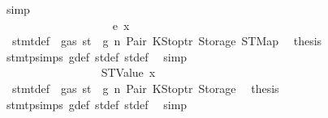 \begin{isabellebody}
\ simp\isanewline
\ \ \ \ \ \ \ \ \ \ \ \ \ \ \ \ \ \ \ \ \isamarkupfalse%
\isanewline
\ \ \ \ \ \ \ \ \ \ \ \ \ \ \ \ \ \ \isamarkupfalse%
\isanewline
\ \ \ \ \ \ \ \ \ \ \ \ \ \ \ \ \isamarkupfalse%
\isanewline
\ \ \ \ \ \ \ \ \ \ \ \ \ \ \ \ \ \ \isamarkupfalse%
\ {\isacharparenleft}{\kern0pt}e\ x{\isacharparenright}{\kern0pt}\isanewline
\ \ \ \ \ \ \ \ \ \ \ \ \ \ \ \ \ \ \isamarkupfalse%
\ {}{\isacharparenleft}{\kern0pt}{}{\isacharparenright}{\kern0pt}\ stmt{\isacharunderscore}{\kern0pt}def\ {\isacharbackquoteopen}{\isasymnot}\ gas\ st\ {\isasymle}\ g{\isacharbackquoteclose}\ n\ Pair\ KStoptr\ Storage\ STMap\ \isamarkupfalse%
\ {\isacharquery}{\kern0pt}thesis\ \isamarkupfalse%
\ stmt{\isachardot}{\kern0pt}psimps{\isacharparenleft}{\kern0pt}{}{\isacharparenright}{\kern0pt}\ g{\isacharunderscore}{\kern0pt}def\ st{\isacharprime}{\kern0pt}{\isacharunderscore}{\kern0pt}def\ st{\isacharprime}{\kern0pt}{\isacharprime}{\kern0pt}{\isacharunderscore}{\kern0pt}def\ \isamarkupfalse%
\ simp\isanewline
\ \ \ \ \ \ \ \ \ \ \ \ \ \ \ \ \isamarkupfalse%
\isanewline
\ \ \ \ \ \ \ \ \ \ \ \ \ \ \isamarkupfalse%
\isanewline
\ \ \ \ \ \ \ \ \ \ \ \ \ \ \ \ \isamarkupfalse%
\ {\isacharparenleft}{\kern0pt}STValue\ x{}{\isacharparenright}{\kern0pt}\isanewline
\ \ \ \ \ \ \ \ \ \ \ \ \ \ \ \ \isamarkupfalse%
\ {}{\isacharparenleft}{\kern0pt}{}{\isacharparenright}{\kern0pt}\ stmt{\isacharunderscore}{\kern0pt}def\ {\isacharbackquoteopen}{\isasymnot}\ gas\ st\ {\isasymle}\ g{\isacharbackquoteclose}\ n\ Pair\ KStoptr\ Storage\ \isamarkupfalse%
\ {\isacharquery}{\kern0pt}thesis\ \isamarkupfalse%
\ stmt{\isachardot}{\kern0pt}psimps{\isacharparenleft}{\kern0pt}{}{\isacharparenright}{\kern0pt}\ g{\isacharunderscore}{\kern0pt}def\ st{\isacharprime}{\kern0pt}{\isacharunderscore}{\kern0pt}def\ st{\isacharprime}{\kern0pt}{\isacharprime}{\kern0pt}{\isacharunderscore}{\kern0pt}def\ \isamarkupfalse%
\ simp\isanewline
\ \ \ \ \ \ \ \ \ \ \ \ \ \ \isamarkupfalse%
\isanewline
\ \ \ \ \ \ \ \ \ \ \ \ \isamarkupfalse%
\isanewline
\ \ \ \ \ \ \ \ \ \ \isamarkupfalse%
\isanewline
\ \ \ \ \ \ \ \ \isamarkupfalse%
\isanewline
\ \ \ \ \ \ \isamarkupfalse%
\isanewline
\ \ \ \ \ \ \ \ \isamarkupfalse%

\end{isabellebody}
